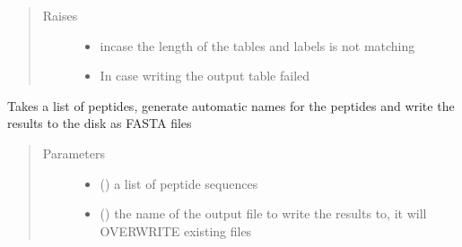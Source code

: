 \documentclass[letterpaper,10pt,english]{sphinxmanual}
\begin{document}
\begin{fulllineitems}
\begin{quote}
\begin{description}
\begin{itemize}
\end{itemize}

\item[{Raises}] \leavevmode\begin{itemize}
\item {} 
 \textendash{} incase the length of the tables and labels is not matching

\item {} 
 \textendash{} In case writing the output table failed

\end{itemize}

\end{description}\end{quote}

\end{fulllineitems}


\begin{fulllineitems}
\label{\detokenize{IPTK.IO:IPTK.IO.OutFunctions.write_auto_named_peptide_to_fasta}}
Takes a list of peptides, generate automatic names for the peptides and write the results to the disk as FASTA files
\begin{quote}\begin{description}
\item[{Parameters}] \leavevmode\begin{itemize}
\item {} 
 () \textendash{} a list of peptide sequences

\item {} 
 () \textendash{} the name of the output file to write the results to, it will OVERWRITE existing files

\end{itemize}

\end{description}\end{quote}

\end{fulllineitems}
\end{document}
